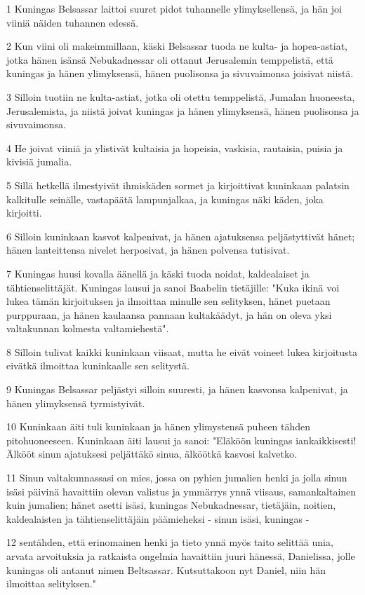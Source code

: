 \par 1 Kuningas Belsassar laittoi suuret pidot tuhannelle ylimyksellensä, ja hän joi viiniä näiden tuhannen edessä.
\par 2 Kun viini oli makeimmillaan, käski Belsassar tuoda ne kulta- ja hopea-astiat, jotka hänen isänsä Nebukadnessar oli ottanut Jerusalemin temppelistä, että kuningas ja hänen ylimyksensä, hänen puolisonsa ja sivuvaimonsa joisivat niistä.
\par 3 Silloin tuotiin ne kulta-astiat, jotka oli otettu temppelistä, Jumalan huoneesta, Jerusalemista, ja niistä joivat kuningas ja hänen ylimyksensä, hänen puolisonsa ja sivuvaimonsa.
\par 4 He joivat viiniä ja ylistivät kultaisia ja hopeisia, vaskisia, rautaisia, puisia ja kivisiä jumalia.
\par 5 Sillä hetkellä ilmestyivät ihmiskäden sormet ja kirjoittivat kuninkaan palatsin kalkitulle seinälle, vastapäätä lampunjalkaa, ja kuningas näki käden, joka kirjoitti.
\par 6 Silloin kuninkaan kasvot kalpenivat, ja hänen ajatuksensa peljästyttivät hänet; hänen lanteittensa nivelet herposivat, ja hänen polvensa tutisivat.
\par 7 Kuningas huusi kovalla äänellä ja käski tuoda noidat, kaldealaiset ja tähtienselittäjät. Kuningas lausui ja sanoi Baabelin tietäjille: "Kuka ikinä voi lukea tämän kirjoituksen ja ilmoittaa minulle sen selityksen, hänet puetaan purppuraan, ja hänen kaulaansa pannaan kultakäädyt, ja hän on oleva yksi valtakunnan kolmesta valtamiehestä".
\par 8 Silloin tulivat kaikki kuninkaan viisaat, mutta he eivät voineet lukea kirjoitusta eivätkä ilmoittaa kuninkaalle sen selitystä.
\par 9 Kuningas Belsassar peljästyi silloin suuresti, ja hänen kasvonsa kalpenivat, ja hänen ylimyksensä tyrmistyivät.
\par 10 Kuninkaan äiti tuli kuninkaan ja hänen ylimystensä puheen tähden pitohuoneeseen. Kuninkaan äiti lausui ja sanoi: "Eläköön kuningas iankaikkisesti! Älkööt sinun ajatuksesi peljättäkö sinua, älköötkä kasvosi kalvetko.
\par 11 Sinun valtakunnassasi on mies, jossa on pyhien jumalien henki ja jolla sinun isäsi päivinä havaittiin olevan valistus ja ymmärrys ynnä viisaus, samankaltainen kuin jumalien; hänet asetti isäsi, kuningas Nebukadnessar, tietäjäin, noitien, kaldealaisten ja tähtienselittäjäin päämieheksi - sinun isäsi, kuningas -
\par 12 sentähden, että erinomainen henki ja tieto ynnä myös taito selittää unia, arvata arvoituksia ja ratkaista ongelmia havaittiin juuri hänessä, Danielissa, jolle kuningas oli antanut nimen Beltsassar. Kutsuttakoon nyt Daniel, niin hän ilmoittaa selityksen."
